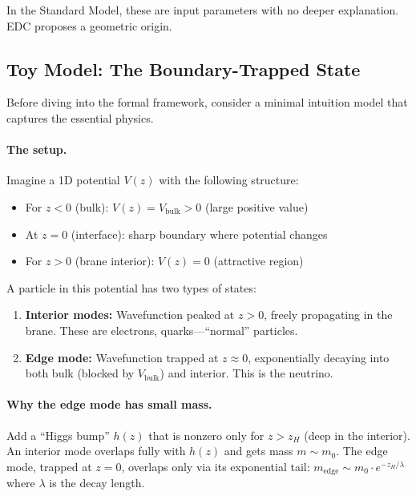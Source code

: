 In the Standard Model, these are input parameters with no deeper explanation.
EDC proposes a geometric origin.

\subsection{Toy Model: The Boundary-Trapped State}
\label{sec:ch6_toy_model}

Before diving into the formal framework, consider a minimal intuition model
that captures the essential physics.

\paragraph{The setup.}
Imagine a 1D potential $V(z)$ with the following structure:
\begin{itemize}[nosep]
    \item For $z < 0$ (bulk): $V(z) = V_{\text{bulk}} > 0$ (large positive value)
    \item At $z = 0$ (interface): sharp boundary where potential changes
    \item For $z > 0$ (brane interior): $V(z) = 0$ (attractive region)
\end{itemize}

A particle in this potential has two types of states:
\begin{enumerate}[nosep]
    \item \textbf{Interior modes:} Wavefunction peaked at $z > 0$, freely propagating
          in the brane. These are electrons, quarks---``normal'' particles.
    \item \textbf{Edge mode:} Wavefunction trapped at $z \approx 0$, exponentially
          decaying into both bulk (blocked by $V_{\text{bulk}}$) and interior.
          This is the neutrino.
\end{enumerate}

\paragraph{Why the edge mode has small mass.}
Add a ``Higgs bump'' $h(z)$ that is nonzero only for $z > z_H$ (deep in the interior).
An interior mode overlaps fully with $h(z)$ and gets mass $m \sim m_0$.
The edge mode, trapped at $z = 0$, overlaps only via its exponential tail:
$m_{\text{edge}} \sim m_0 \cdot e^{-z_H / \lambda}$ where $\lambda$ is the decay length.

